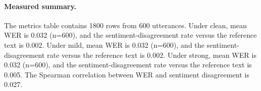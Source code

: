 \paragraph{Measured summary.} The metrics table contains 1800 rows from 600 utterances. Under clean, mean WER is 0.032 (n=600), and the sentiment-disagreement rate versus the reference text is 0.002. Under mild, mean WER is 0.032 (n=600), and the sentiment-disagreement rate versus the reference text is 0.002. Under strong, mean WER is 0.032 (n=600), and the sentiment-disagreement rate versus the reference text is 0.005. The Spearman correlation between WER and sentiment disagreement is 0.027.
